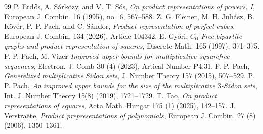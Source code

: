 \documentclass[10pt,a4paper]{amsart}
\numberwithin{equation}{section}
\newcommand{\1}{\mathbf 1}
\begin{document}
\begin{thebibliography}{99}
 P. Erd\H{o}s, A. S\'ark\"ozy, and V. T. S\'os, {\it On product representations of powers, I}, {European J. Combin.} 16 (1995), no.~6, 567--588.
 Z. G. Fleiner, M. H. Juh\'asz, B. K\"ov\'er, P. P. Pach, and C. S\'andor, {\it Product representation of perfect cubes}, {European J. Combin.} 134 (2026), Article 104342.
 E. Gy\H{o}ri, {\it $C_6$-Free bipartite graphs and product representation of squares}, {Discrete Math.} 165 (1997), 371--375.
 P. P. Pach, M. Vizer {\it Improved upper bounds for multiplicative squarefree sequences}, {Electron. J. Comb} 30 (4) (2023), Artical Number P4.31.
 P. P. Pach, {\it Generelized multiplicative Sidon sets}, {J. Number Theory} 157 (2015), 507--529.
 P. P. Pach, {\it An improved upper bounds for the size of the multiplicative $3$-Sidon sets}, {Int. J. Number Theory} 15(8) (2019), 1721--1729.
 T. Tao, {\it On product representations of squares}, {Acta Math. Hungar} 175 (1) (2025), 142--157.
 J. Verstra\"ete, {\it Product prepresentations of polynomials}, {European J. Combin.} 27 (8) (2006), 1350--1361.
\end{thebibliography}
\end{document}
